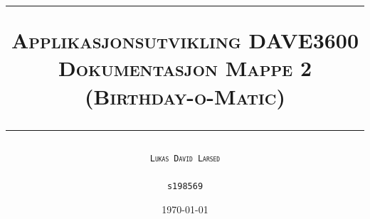 \begin{titlepage}
 



\title{
\rule{\linewidth}{0.5mm}
\textsc{\LARGE Applikasjonsutvikling DAVE3600\\ \large Dokumentasjon Mappe 2 (Birthday-o-Matic)}
\rule{\linewidth}{0.5mm}
}





\author{\LARGE \textsc{\texttt{Lukas David Larsed}}\\ \\ \LARGE \texttt{s198569}}



\date{\today}



\end{titlepage}
